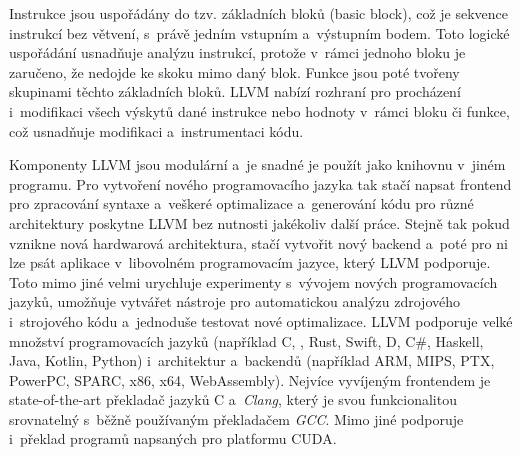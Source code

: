 Instrukce jsou uspořádány do tzv. základních bloků (basic block), což je sekvence instrukcí bez větvení, s~právě jedním vstupním a~výstupním bodem. Toto logické uspořádání usnadňuje analýzu instrukcí, protože v~rámci jednoho bloku je zaručeno, že nedojde ke skoku mimo daný blok. Funkce jsou poté tvořeny skupinami těchto základních bloků. LLVM nabízí rozhraní pro procházení i~modifikaci všech výskytů dané instrukce nebo hodnoty v~rámci bloku či funkce, což usnadňuje modifikaci a~instrumentaci kódu.

Komponenty LLVM jsou modulární a~je snadné je použít jako knihovnu v~jiném programu. Pro vytvoření nového programovacího jazyka tak stačí napsat frontend pro zpracování syntaxe a~veškeré optimalizace a~generování kódu pro různé architektury poskytne LLVM bez nutnosti jakékoliv další práce. Stejně tak pokud vznikne nová hardwarová architektura, stačí vytvořit nový backend a~poté pro ni lze psát aplikace v~libovolném programovacím jazyce, který LLVM podporuje. Toto mimo jiné velmi urychluje experimenty s~vývojem nových programovacích jazyků, umožňuje vytvářet nástroje pro automatickou analýzu zdrojového i~strojového kódu a~jednoduše testovat nové optimalizace.
LLVM podporuje velké množství programovacích jazyků (například C, \CPP, Rust, Swift, D, C\#, Haskell, Java, Kotlin, Python) i~architektur a~backendů (například ARM, MIPS, PTX, PowerPC, SPARC, x86, x64, WebAssembly). Nejvíce vyvíjeným frontendem je state-of-the-art překladač jazyků C a~\CPP \hspace{1mm}\emph{Clang}, který je svou funkcionalitou srovnatelný s~běžně používaným překladačem \emph{GCC}. Mimo jiné podporuje i~překlad programů napsaných pro platformu CUDA.

